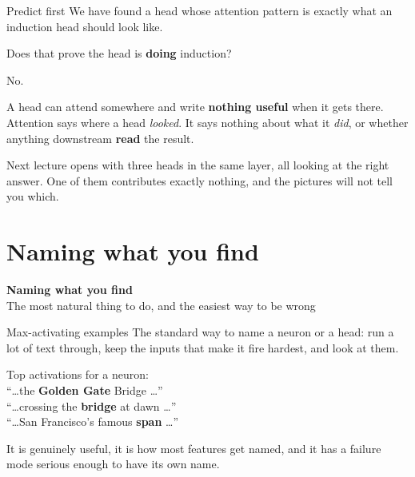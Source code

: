 \documentclass[aspectratio=169]{beamer}
\newcommand{\trapbox}[1]{%
  \begin{tcolorbox}[colback=armred!8, colframe=armred, boxrule=0.6pt, arc=2pt]
  #1
  \end{tcolorbox}}
\newcommand{\sectiontransition}[2]{%
  \begin{frame}[plain]
    \vfill
    \begin{center}
      {\Huge\bfseries\color{popblue} #1}\\[1.1em]
      {\large #2}
    \end{center}
    \vfill
  \end{frame}}
\begin{document}
\begin{frame}{Predict first}
  \vspace{0.9em}
  We have found a head whose attention pattern is exactly what an induction head should look
  like.

  \vspace{1.1em}
  \begin{center}
    {\large Does that prove the head is \textbf{doing} induction?}
  \end{center}

  \vspace{1.1em}
  \pause
  No.

  \vspace{0.5em}
  \trapbox{A head can attend somewhere and write \textbf{nothing useful} when it gets there.
  Attention says where a head \emph{looked}. It says nothing about what it \emph{did}, or
  whether anything downstream \textbf{read} the result.}

  \vspace{0.6em}
  Next lecture opens with three heads in the same layer, all looking at the right answer. One of
  them contributes exactly nothing, and the pictures will not tell you which.
\end{frame}

\section{Naming what you find}
\sectiontransition{Naming what you find}{The most natural thing to do, and the easiest way to be wrong}

\begin{frame}{Max-activating examples}
  \vspace{0.6em}
  The standard way to name a neuron or a head: run a lot of text through, keep the inputs that
  make it fire hardest, and look at them.

  \vspace{0.7em}
  \begin{center}
  \begin{tcolorbox}[colback=lightbg, colframe=gray, boxrule=0.5pt, arc=2pt, width=0.9\textwidth]
    \small
    Top activations for a neuron:\\[0.3em]
    \ttfamily\scriptsize
    ``\ldots the \textbf{Golden Gate} Bridge \ldots''\\
    ``\ldots crossing the \textbf{bridge} at dawn \ldots''\\
    ``\ldots San Francisco's famous \textbf{span} \ldots''
  \end{tcolorbox}
  \end{center}

  \vspace{0.5em}
  It is genuinely useful, it is how most features get named, and it has a failure mode serious
  enough to have its own name.
\end{frame}
\end{document}
